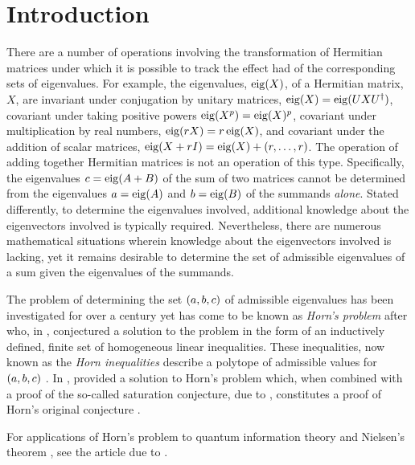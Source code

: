 \documentclass[notitlepage, 10pt]{article}
\begin{document}
\tableofcontents

\section{Introduction}

There are a number of operations involving the transformation of Hermitian matrices under which it is possible to track the effect had of the corresponding sets of eigenvalues.
For example, the eigenvalues, $\operatorname{eig}(X)$, of a Hermitian matrix, $X$, are invariant under conjugation by unitary matrices, $\operatorname{eig}(X) = \operatorname{eig}(UXU^{\dagger})$, covariant under taking positive powers $\operatorname{eig}(X^p) = \operatorname{eig}(X)^p$, covariant under multiplication by real numbers, $\operatorname{eig}(r X) = r \operatorname{eig}(X)$, and covariant under the addition of scalar matrices, $\operatorname{eig}(X+rI) = \operatorname{eig}(X) + (r,\ldots,r)$.
The operation of adding together Hermitian matrices is not an operation of this type.
Specifically, the eigenvalues $c = \operatorname{eig}(A+B)$ of the sum of two matrices cannot be determined from the eigenvalues $a = \operatorname{eig}(A)$ and $b = \operatorname{eig}(B)$ of the summands \textit{alone}.
Stated differently, to determine the eigenvalues involved, additional knowledge about the eigenvectors involved is typically required.
Nevertheless, there are numerous mathematical situations wherein knowledge about the eigenvectors involved is lacking, yet it remains desirable to determine the set of admissible eigenvalues of a sum given the eigenvalues of the summands.

The problem of determining the set $(a,b,c)$ of admissible eigenvalues has been investigated for over a century yet has come to be known as \textit{Horn's problem} after \citeauthor{horn1962eigenvalues} who, in \citeyear{horn1962eigenvalues}, conjectured a solution to the problem in the form of an inductively defined, finite set of homogeneous linear inequalities.
These inequalities, now known as the \textit{Horn inequalities} describe a polytope of admissible values for $(a,b,c)$ \cite{horn1962eigenvalues}.
In \citeyear{klyachko1998stable}, \citeauthor{klyachko1998stable} provided a solution to Horn's problem \cite{klyachko1998stable} which, when combined with a proof of the so-called saturation conjecture, due to \citeauthor{knutson1999honeycomb} \cite{knutson1999honeycomb}, constitutes a proof of Horn's original conjecture \cite{fulton1998eigenvalues}.

For applications of Horn's problem to quantum information theory and Nielsen's theorem \cite{nielsen1999conditions}, see the article due to \citeauthor{daftuar2005quantum} \cite{daftuar2005quantum}.
\end{document}
